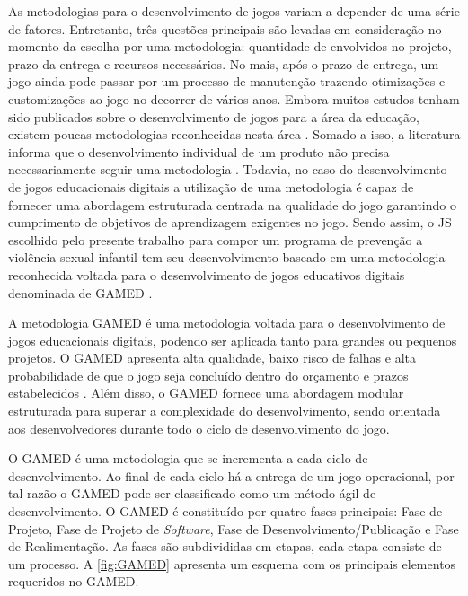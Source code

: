 As metodologias para o desenvolvimento de jogos variam a depender de uma série de fatores. Entretanto, três questões principais são levadas em consideração no momento da escolha por uma metodologia: quantidade de envolvidos no projeto, prazo da entrega e recursos necessários. No mais, após o prazo de entrega, um jogo ainda pode passar por um processo de manutenção trazendo otimizações e customizações ao jogo no decorrer de vários anos. Embora muitos estudos tenham sido publicados sobre o desenvolvimento de jogos para a área da educação, existem poucas metodologias reconhecidas nesta área \cite{aslan2015gamed}. Somado a isso, a literatura informa que o desenvolvimento individual de um produto não precisa necessariamente seguir uma metodologia \cite{valente2021engenharia}. Todavia, no caso do desenvolvimento de jogos educacionais digitais a utilização de uma metodologia é capaz de fornecer uma abordagem estruturada centrada na qualidade do jogo garantindo o cumprimento de objetivos de aprendizagem exigentes no jogo. Sendo assim, o \ac{JS} escolhido pelo presente trabalho para compor um programa de prevenção a violência sexual infantil tem seu desenvolvimento baseado em uma metodologia reconhecida voltada para o desenvolvimento de jogos educativos digitais denominada de \ac{GAMED} \cite{aslan2016digital}. 

A metodologia \ac{GAMED} é uma metodologia voltada para o desenvolvimento de jogos educacionais digitais, podendo ser aplicada tanto para grandes ou pequenos projetos. O \ac{GAMED} apresenta alta qualidade, baixo risco de falhas e alta probabilidade de que o jogo seja concluído dentro do orçamento e prazos estabelecidos \cite{aslan2015gamed}. Além disso, o \ac{GAMED} fornece uma abordagem modular estruturada para superar a complexidade do desenvolvimento, sendo orientada aos desenvolvedores durante todo o ciclo de desenvolvimento do jogo.

O \ac{GAMED} é uma metodologia que se incrementa a cada ciclo de desenvolvimento. Ao final de cada ciclo há a entrega de um jogo operacional, por tal razão o \ac{GAMED} pode ser classificado como um método ágil de desenvolvimento. O \ac{GAMED} é constituído por quatro fases principais: Fase de Projeto, Fase de Projeto de \textit{Software}, Fase de Desenvolvimento/Publicação e Fase de Realimentação. As fases são subdivididas em etapas, cada etapa consiste de um processo. A \autoref{fig:GAMED} apresenta um esquema com os principais elementos requeridos no \ac{GAMED}. 

\pagebreak

